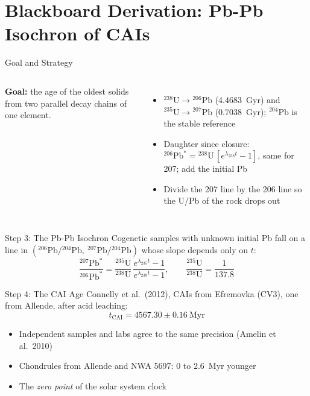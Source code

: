 \documentclass[aspectratio=169, 11pt]{beamer}
\begin{document}
\section{Blackboard Derivation: Pb-Pb Isochron of CAIs}

\begin{frame}{Goal and Strategy}
  \begin{columns}[c]
    \column{\recapfigcolnarrow}
    \column{\recaptextcolwide}
    \small
    \textbf{Goal:} the age of the oldest solids from two parallel decay chains of one element.
    \vskip4pt
    \begin{itemize}\setlength\itemsep{2pt}
      \item $^{238}\mathrm{U} \to {}^{206}\mathrm{Pb}$ (4.4683~Gyr) and $^{235}\mathrm{U} \to {}^{207}\mathrm{Pb}$ (0.7038~Gyr); $^{204}\mathrm{Pb}$ is the stable reference
      \item Daughter since closure: ${}^{206}\mathrm{Pb}^* = {}^{238}\mathrm{U}\,[e^{\lambda_{238} t} - 1]$, same for 207; add the initial Pb
      \item Divide the 207 line by the 206 line so the U/Pb of the rock drops out
    \end{itemize}
    \vskip4pt
  \end{columns}
\end{frame}

\begin{frame}{Step 3: The Pb-Pb Isochron}
  Cogenetic samples with unknown initial Pb fall on a line in $({}^{206}\mathrm{Pb}/{}^{204}\mathrm{Pb},\ {}^{207}\mathrm{Pb}/{}^{204}\mathrm{Pb})$ whose slope depends only on $t$:
  \[
    \boxed{\; \frac{{}^{207}\mathrm{Pb}^*}{{}^{206}\mathrm{Pb}^*} = \frac{{}^{235}\mathrm{U}}{{}^{238}\mathrm{U}}\,\frac{e^{\lambda_{235} t} - 1}{e^{\lambda_{238} t} - 1}, \qquad \frac{{}^{235}\mathrm{U}}{{}^{238}\mathrm{U}} = \frac{1}{137.8} \;}
  \]
\end{frame}

\begin{frame}{Step 4: The CAI Age}
  Connelly et al.\ (2012), CAIs from Efremovka (CV3), one from Allende, after acid leaching:
  \[
    \boxed{\; t_{\text{CAI}} = 4567.30 \pm 0.16\ \mathrm{Myr} \;}
  \]
  \begin{itemize}
    \item Independent samples and labs agree to the same precision (Amelin et al.\ 2010)
    \item Chondrules from Allende and NWA 5697: $0$ to $2.6$~Myr younger
    \item The \emph{zero point} of the solar system clock
  \end{itemize}
  \vskip4pt
\end{frame}
\end{document}
